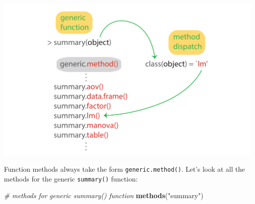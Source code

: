 \documentclass[
]{book}
\newenvironment{Shaded}{\begin{snugshade}}{\end{snugshade}}
\newcommand{\CommentTok}[1]{\textcolor[rgb]{0.56,0.35,0.01}{\textit{#1}}}
\newcommand{\KeywordTok}[1]{\textcolor[rgb]{0.13,0.29,0.53}{\textbf{#1}}}
\newcommand{\NormalTok}[1]{#1}
\newcommand{\StringTok}[1]{\textcolor[rgb]{0.31,0.60,0.02}{#1}}
\begin{document}
\includegraphics{R/Rmodels/images/methods.png}

Function methods always take the form \texttt{generic.method()}. Let's look at all the methods for the generic \texttt{summary()} function:

\begin{Shaded}
\begin{Highlighting}[]
  \CommentTok{\# methods for generic \textasciigrave{}summary()\textasciigrave{} function}
  \KeywordTok{methods}\NormalTok{(}\StringTok{"summary"}\NormalTok{)}
\end{Highlighting}
\end{Shaded}
\end{document}
